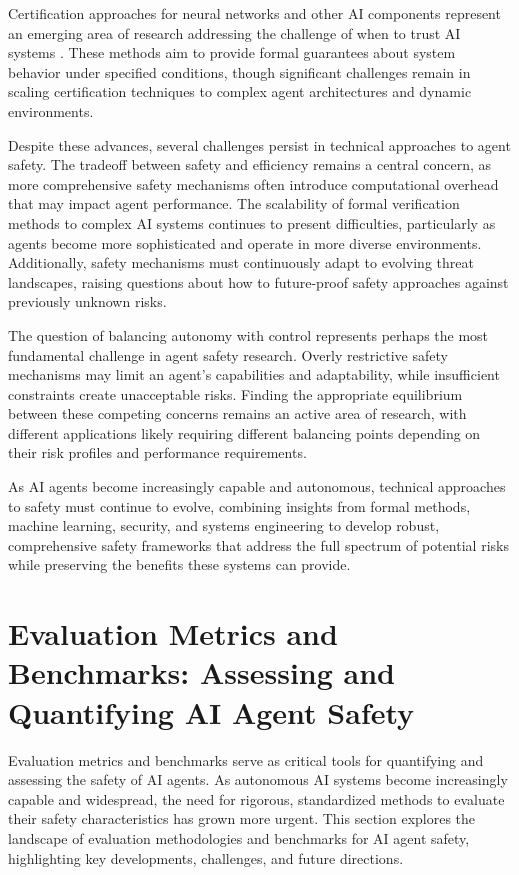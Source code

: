 \documentclass[conference]{IEEEtran}
\begin{document}
Certification approaches for neural networks and other AI components represent an emerging area of research addressing the challenge of when to trust AI systems \cite{2309.11196}. These methods aim to provide formal guarantees about system behavior under specified conditions, though significant challenges remain in scaling certification techniques to complex agent architectures and dynamic environments.

Despite these advances, several challenges persist in technical approaches to agent safety. The tradeoff between safety and efficiency remains a central concern, as more comprehensive safety mechanisms often introduce computational overhead that may impact agent performance. The scalability of formal verification methods to complex AI systems continues to present difficulties, particularly as agents become more sophisticated and operate in more diverse environments. Additionally, safety mechanisms must continuously adapt to evolving threat landscapes, raising questions about how to future-proof safety approaches against previously unknown risks.

The question of balancing autonomy with control represents perhaps the most fundamental challenge in agent safety research. Overly restrictive safety mechanisms may limit an agent's capabilities and adaptability, while insufficient constraints create unacceptable risks. Finding the appropriate equilibrium between these competing concerns remains an active area of research, with different applications likely requiring different balancing points depending on their risk profiles and performance requirements.

As AI agents become increasingly capable and autonomous, technical approaches to safety must continue to evolve, combining insights from formal methods, machine learning, security, and systems engineering to develop robust, comprehensive safety frameworks that address the full spectrum of potential risks while preserving the benefits these systems can provide.



\section{Evaluation Metrics and Benchmarks: Assessing and Quantifying AI Agent Safety}

Evaluation metrics and benchmarks serve as critical tools for quantifying and assessing the safety of AI agents. As autonomous AI systems become increasingly capable and widespread, the need for rigorous, standardized methods to evaluate their safety characteristics has grown more urgent. This section explores the landscape of evaluation methodologies and benchmarks for AI agent safety, highlighting key developments, challenges, and future directions.
\end{document}
